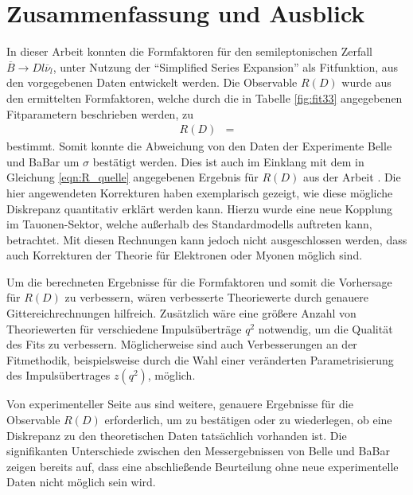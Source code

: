 \chapter{Zusammenfassung und Ausblick}

In dieser Arbeit konnten die Formfaktoren für den semileptonischen Zerfall $\overline{B} \to D l \overline{\nu}_l$, unter Nutzung der \enquote{Simplified Series Expansion} als Fitfunktion, aus den vorgegebenen Daten entwickelt werden.
Die Observable $R(D)$ wurde aus den ermittelten Formfaktoren, welche durch die in Tabelle \ref{fig:fit33} angegebenen Fitparametern beschrieben werden, zu
\begin{align*}
  R(D) &= 
\end{align*}
bestimmt.
Somit konnte die Abweichung von den Daten der Experimente Belle und BaBar um $\sigma$ bestätigt werden.
Dies ist auch im Einklang mit dem in Gleichung \eqref{eqn:R_quelle} angegebenen Ergebnis für $R(D)$ aus der Arbeit \cite{PhysRevD.92.034506}.
Die hier angewendeten Korrekturen haben exemplarisch gezeigt, wie diese mögliche Diskrepanz quantitativ erklärt werden kann.
Hierzu wurde eine neue Kopplung im Tauonen-Sektor, welche außerhalb des Standardmodells auftreten kann, betrachtet.
Mit diesen Rechnungen kann jedoch nicht ausgeschlossen werden, dass auch Korrekturen der Theorie für Elektronen oder Myonen möglich sind.

Um die berechneten Ergebnisse für die Formfaktoren und somit die Vorhersage für $R(D)$ zu verbessern, wären verbesserte Theoriewerte durch genauere Gittereichrechnungen hilfreich.
Zusätzlich wäre eine größere Anzahl von Theoriewerten für verschiedene Impulsüberträge $q^2$ notwendig, um die Qualität des Fits zu verbessern.
Möglicherweise sind auch Verbesserungen an der Fitmethodik, beispielsweise durch die Wahl einer veränderten Parametrisierung des Impulsübertrages $z(q^2)$, möglich.

Von experimenteller Seite aus sind weitere, genauere Ergebnisse für die Observable $R(D)$ erforderlich, um zu bestätigen oder zu wiederlegen, ob eine Diskrepanz zu den theoretischen Daten tatsächlich vorhanden ist.
Die signifikanten Unterschiede zwischen den Messergebnissen von Belle und BaBar zeigen bereits auf, dass eine abschließende Beurteilung ohne neue experimentelle Daten nicht möglich sein wird.
